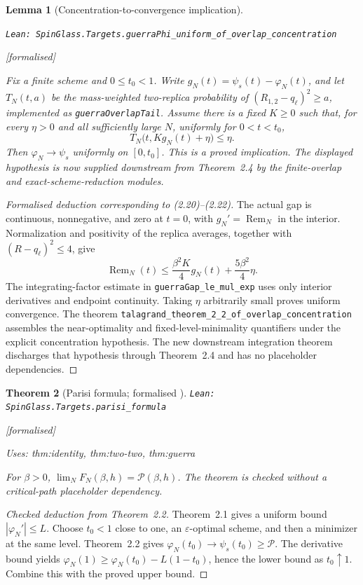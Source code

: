 \documentclass[11pt]{article}
\providecommand{\lean}[1]{\leavevmode\par\nopagebreak
  {\noindent\normalfont\footnotesize\raggedright\texttt{Lean: #1}\par}\nopagebreak}
\providecommand{\leanok}{\par\nopagebreak
  {\noindent\normalfont\footnotesize\textcolor{green!50!black}{[formalised]}\par}\nopagebreak}
\providecommand{\uses}[1]{\par\nopagebreak
  {\noindent\normalfont\footnotesize Uses: #1\par}\nopagebreak}
\newtheorem{theorem}{Theorem}[section]
\newtheorem{lemma}[theorem]{Lemma}
\begin{document}
\begin{lemma}[Concentration-to-convergence implication]\label{lem:concentration-convergence}
\lean{SpinGlass.Targets.guerraPhi\_uniform\_of\_overlap\_concentration}\leanok
Fix a finite scheme and $0\le t_0<1$. Write
$g_N(t)=\psi_s(t)-\varphi_N(t)$, and let $T_N(t,a)$ be the mass-weighted
two-replica probability of $(R_{1,2}-q_\ell)^2\ge a$, implemented as
\texttt{guerraOverlapTail}.
Assume there is a fixed $K\ge0$ such that, for every $\eta>0$ and all
sufficiently large $N$, uniformly for $0<t<t_0$,
\[
T_N\bigl(t,Kg_N(t)+\eta\bigr)\le\eta.
\]
Then $\varphi_N\to\psi_s$ uniformly on $[0,t_0]$.
This is a proved implication. The displayed hypothesis is now supplied downstream
from Theorem~2.4 by the finite-overlap and exact-scheme-reduction modules.
\end{lemma}

\begin{proof}[Formalised deduction corresponding to (2.20)--(2.22)]
The actual gap is continuous, nonnegative, and zero at $t=0$, with
$g_N'=\operatorname{Rem}_N$ in the interior. Normalization and positivity of
the replica averages, together with $(R-q_\ell)^2\le4$, give
\[
\operatorname{Rem}_N(t)\le\frac{\beta^2K}{4}g_N(t)
  +\frac{5\beta^2}{4}\eta.
\]
The integrating-factor estimate in \texttt{guerraGap\_le\_mul\_exp} uses
only interior derivatives and endpoint continuity. Taking $\eta$ arbitrarily
small proves uniform convergence. The theorem
\texttt{talagrand\_theorem\_2\_2\_of\_overlap\_concentration} assembles
the near-optimality and fixed-level-minimality quantifiers under the explicit
concentration hypothesis. The new downstream integration theorem discharges that
hypothesis through Theorem~2.4 and has no placeholder dependencies.
\end{proof}

\begin{theorem}[Parisi formula; formalised \cite{Tal06}]
\lean{SpinGlass.Targets.parisi\_formula}\leanok
\uses{thm:identity, thm:two-two, thm:guerra}
For $\beta>0$, $\lim_N F_N(\beta,h)=\mathcal P(\beta,h)$.
The theorem is checked without a critical-path placeholder dependency.
\end{theorem}

\begin{proof}[Checked deduction from Theorem~2.2]
Theorem~2.1 gives a uniform bound $|\varphi_N'|\le L$. Choose $t_0<1$ close to
one, an $\varepsilon$-optimal scheme, and then a minimizer at the same level.
Theorem~2.2 gives $\varphi_N(t_0)\to\psi_s(t_0)\ge\mathcal P$.
The derivative bound yields
$\varphi_N(1)\ge\varphi_N(t_0)-L(1-t_0)$, hence the lower bound as $t_0\uparrow1$.
Combine this with the proved upper bound.
\end{proof}
\end{document}
